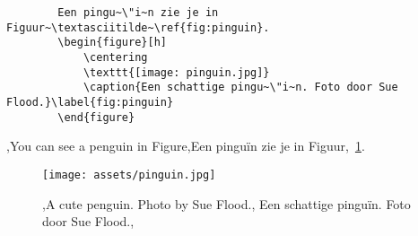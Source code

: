



\begin{frame}[fragile]{%
    }%
    \vspace{-28px}
    \begin{verbatim}
        Een pingu~\"i~n zie je in Figuur~\textasciitilde~\ref{fig:pinguin}.
        \begin{figure}[h]
            \centering
            \texttt{[image: pinguin.jpg]}
            \caption{Een schattige pingu~\"i~n. Foto door Sue Flood.}\label{fig:pinguin}
        \end{figure}
    \end{verbatim}
    
    \begin{penExResult}[3cm]
        \lang,You can see a penguin in Figure,Een pinguïn zie je in Figuur,~\ref{fig:pinguin}.
        \begin{figure}[h]
            \centering
            \texttt{[image: assets/pinguin.jpg]}
            \caption{\lang,A cute penguin. Photo by Sue Flood.,%
            Een schattige pinguïn. Foto door Sue Flood.,}\label{fig:pinguin}
        \end{figure}
    \end{penExResult}
\end{frame}

